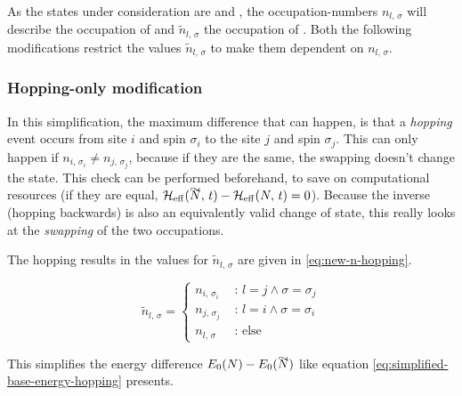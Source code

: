 As the states under consideration are \ketN[N] and , the occupation-numbers $n_{l,\,\sigma}$ will describe the occupation of \ketN[N] and $\tilde{n}_{l,\,\sigma}$ the occupation of .
Both the following modifications restrict the values $\tilde{n}_{l,\,\sigma}$ to make them dependent on $n_{l,\,\sigma}$.

\subsubsection*{Hopping-only modification}

In this simplification, the maximum difference that can happen, is that a \emph{hopping} event occurs from site $i$ and spin $\sigma_i$ to the site $j$ and spin $\sigma_j$. 
This can only happen if $n_{i,\,\sigma_i} \neq n_{j,\,\sigma_j}$, because if they are the same, the swapping doesn't change the state. 
This check can be performed beforehand, to save on computational resources (if they are equal, $\HeffOft[\vphantom{N}\smash{\tilde{N}}]-\HeffOft[N] = 0$).
Because the inverse (hopping backwards) is also an equivalently valid change of state, this really looks at the \emph{swapping} of the two occupations.

The hopping results in the values for $\tilde{n}_{l,\,\sigma}$ are given in \autoref{eq:new-n-hopping}.

\begin{equation}
    \label{eq:new-n-hopping}
    \tilde{n}_{l,\,\sigma} = \begin{cases}
        n_{i,\,\sigma_i}&\text{ : } l = j \land \sigma = \sigma_j   \\
        n_{j,\,\sigma_j}&\text{ : } l = i \land \sigma = \sigma_i   \\
        n_{l,\,\sigma} &\text{ : else}
    \end{cases}
\end{equation}

This simplifies the energy difference $E_0(N)-E_0(\vphantom{N}\smash{\tilde{N}})$ like equation \autoref{eq:simplified-base-energy-hopping} presents.

